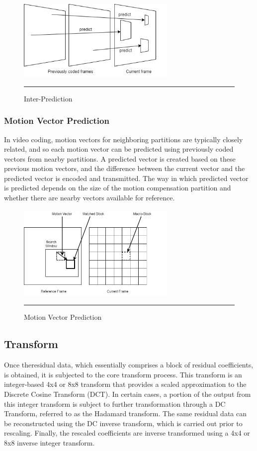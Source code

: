 \begin{figure}[htbp]
	\centering
	\includegraphics[width = 3in]{./Figures/interprediction.png}
	\rule{35em}{0.5pt}
	\caption{Inter-Prediction}
	\label{fig:interprediction}
\end{figure}

\subsubsection{Motion Vector Prediction}
In video coding, motion vectors for neighboring partitions are typically closely related, and so each motion vector can be predicted using previously coded vectors from nearby partitions. A predicted vector is created based on these previous motion vectors, and the difference between the current vector and the predicted vector is encoded and transmitted. The way in which predicted vector is predicted depends on the size of the motion compensation partition and whether there are nearby vectors available for reference.

\begin{figure}[htbp]
	\centering
	\includegraphics[width = 3in]{./Figures/motionvector.png}
	\rule{35em}{0.5pt}
	\caption{Motion Vector Prediction}
	\label{fig:motionvector}
\end{figure}

\subsection{Transform}
Once theresidual data, which essentially comprises a block of residual coefficients, is obtained, it is subjected to the core transform process. This transform is an integer-based 4x4 or 8x8 transform that provides a scaled approximation to the Discrete Cosine Transform (DCT). In certain cases, a portion of the output from this integer transform is subject to further transformation through a DC Transform, referred to as the Hadamard transform. The same residual data can be reconstructed using the DC inverse transform, which is carried out prior to rescaling. Finally, the rescaled coefficients are inverse transformed using a 4x4 or 8x8 inverse integer transform.

